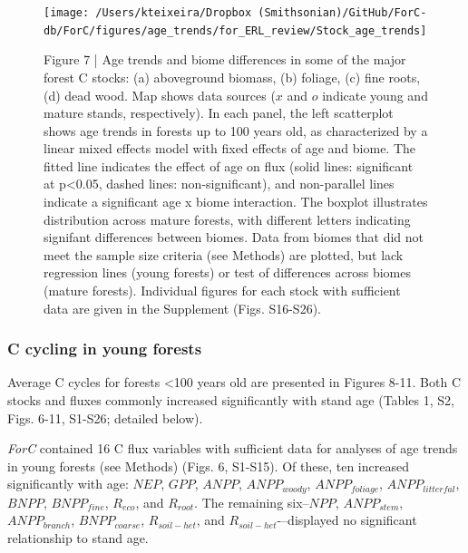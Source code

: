 \documentclass[
]{article}
\begin{document}
\begin{figure}[H]

{\centering \texttt{[image: /Users/kteixeira/Dropbox (Smithsonian)/GitHub/ForC-db/ForC/figures/age\_trends/for\_ERL\_review/Stock\_age\_trends]} 

}

\caption{Figure 7 | Age trends and biome differences in some of the major forest C stocks: (a) aboveground biomass, (b) foliage, (c) fine roots, (d) dead wood. Map shows data sources ($x$ and $o$ indicate young and mature stands, respectively). In each panel, the left scatterplot  shows age trends in forests up to 100 years old, as characterized by a linear mixed effects model with fixed effects of age and biome. The fitted line indicates the effect of age on flux (solid lines: significant at p<0.05, dashed lines: non-significant), and non-parallel lines indicate a significant age x biome interaction. The boxplot illustrates distribution across mature forests, with different letters indicating signifant differences between biomes. Data from biomes that did not meet the sample size criteria (see Methods) are plotted, but lack regression lines (young forests) or test of differences across biomes (mature forests). Individual figures for each stock with sufficient data are given in the Supplement (Figs. S16-S26).}\label{fig:unnamed-chunk-14}
\end{figure}

\hypertarget{c-cycling-in-young-forests}{%
\subsubsection{C cycling in young
forests}\label{c-cycling-in-young-forests}}

Average C cycles for forests \textless100 years old are presented in
Figures 8-11. Both C stocks and fluxes commonly increased significantly
with stand age (Tables 1, S2, Figs. 6-11, S1-S26; detailed below).

\emph{ForC} contained 16 C flux variables with sufficient data for
analyses of age trends in young forests (see Methods) (Figs. 6, S1-S15).
Of these, ten increased significantly with age: \(NEP\), \(GPP\),
\(ANPP\), \(ANPP_{woody}\), \(ANPP_{foliage}\), \(ANPP_{litterfal}\),
\(BNPP\), \(BNPP_{fine}\), \(R_{eco}\), and \(R_{root}\). The remaining
six--\(NPP\), \(ANPP_{stem}\), \(ANPP_{branch}\), \(BNPP_{coarse}\),
\(R_{soil-het}\), and \(R_{soil-het}\)-\/--displayed no significant
relationship to stand age.
\end{document}
